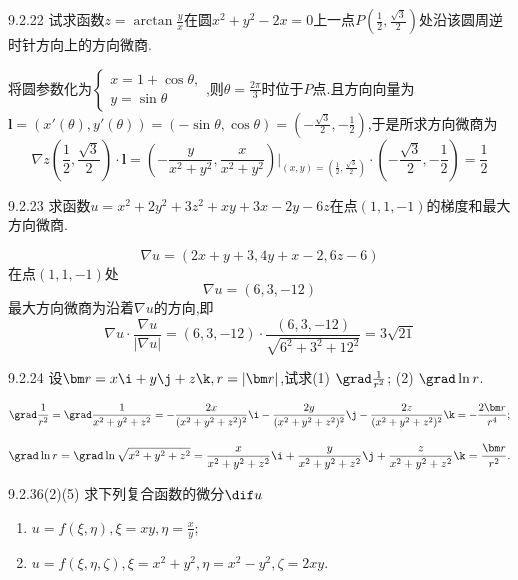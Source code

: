 \begin{exercise}{9.2.22}
试求函数$z = \arctan \frac{y}{x}$在圆$x^2+y^2-2x=0$上一点$P(\frac12,\frac{\sqrt{3}}{2})$处沿该圆周逆时针方向上的方向微商.
\end{exercise}

\begin{solution}
    将圆参数化为$\begin{cases}
        x = 1 + \cos \theta,\\
        y = \sin \theta
    \end{cases}$,则$\theta = \frac{2\pi}{3}$时位于$P$点.且方向向量为$\bm l  = (x'(\theta), y'(\theta)) = (-\sin \theta, \cos \theta) =(-\frac{\sqrt 3}{2}, -\frac12) $,于是所求方向微商为
    $$\nabla z \left(\frac12,\frac{\sqrt 3}{2}\right) \cdot \bm l = \left( - \frac{y}{x^2+y^2}, \frac{x}{x^2+y^2} \right) \Bigg|_{(x,y) =(\frac{1}{2},\frac{\sqrt 3}{2})} \cdot (-\frac{\sqrt 3}{2}, -\frac12) = \frac12$$
\end{solution}

\begin{exercise}{9.2.23}
求函数$u = x^2+2y^2+3z^2+xy+3x-2y-6z$在点$(1,1,-1)$的梯度和最大方向微商.
\end{exercise}

\begin{solution}
    $$\nabla u = (2x+y+3, 4y+x-2, 6z-6)$$
    在点$(1,1,-1)$处
    $$\nabla u = (6, 3, -12)$$
    最大方向微商为沿着$\nabla u$的方向,即
    $$\nabla u \cdot \frac{\nabla u}{|\nabla u|} = (6, 3, -12) \cdot \frac{(6, 3, -12)}{\sqrt{6^2+3^2+12^2}} = 3\sqrt{21}$$
\end{solution}

\begin{exercise}{9.2.24}
设$\bm r = x \i + y \j + z\k, r = | \bm r|$,试求(1) $\grad \frac{1}{r^2}$; (2) $\grad \ln r$.
\end{exercise}

\begin{solution}
$$\grad \frac{1}{r^2} = \grad \frac{1}{x^2+y^2+z^2} = -\frac{2x}{(x^2+y^2+z^2)^2} \i - \frac{2y}{(x^2+y^2+z^2)^2} \j - \frac{2z}{(x^2+y^2+z^2)^2} \k = - \frac{2\bm r}{r^4};$$

$$\grad \ln r = \grad \ln \sqrt{x^2+y^2+z^2} = \frac{x}{x^2+y^2+z^2} \i + \frac{y}{x^2+y^2+z^2} \j + \frac{z}{x^2+y^2+z^2} \k= \frac{\bm r}{r^2}.$$
\end{solution}

\begin{exercise}{9.2.36(2)(5)}
求下列复合函数的微分$\dif u$
\begin{enumerate}
    \item[(2)] $u = f(\xi,\eta) ,\xi = xy, \eta = \frac{x}{y}$;
    \item[(5)] $u = f(\xi,\eta,\zeta),\xi = x^2+y^2, \eta = x^2 -y^2, \zeta = 2xy$.
\end{enumerate}
\end{exercise}

